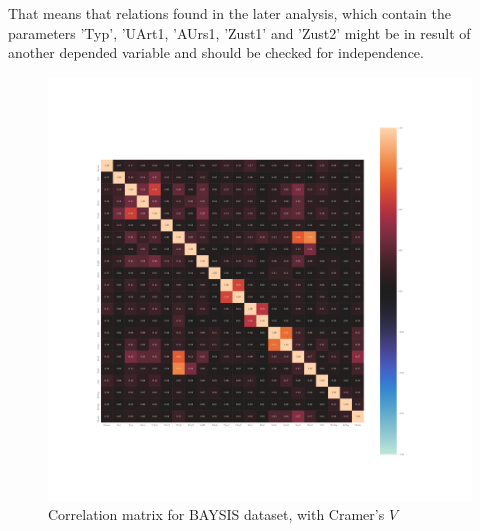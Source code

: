 
That means that relations found in the later analysis, which contain the parameters 'Typ', 'UArt1, 'AUrs1, 'Zust1' and 'Zust2' might be in result of another depended variable and should be checked for independence.

\pagestyle{empty}
\begin{figure}[ht]
	\centering
	\includegraphics[scale=0.4, trim=4cm 6cm 0cm 6cm]{../CorrAnalysis/data/BAYSIS/01_dataset/plots/baysis_dataset_corr_cramers}
	\caption{Correlation matrix for BAYSIS dataset, with Cramer's $V$}
	\label{img:correlation_matrix_dataset_cramers}
\end{figure}
\restoregeometry
\pagestyle{headings}

